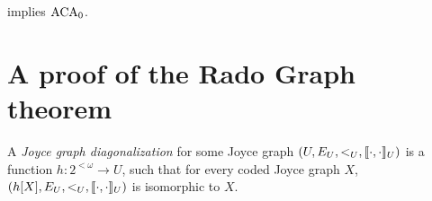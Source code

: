 \begin{corollary}
 implies $\mathrm{ACA}_0$.
\end{corollary}

\section{A proof of the Rado Graph theorem}\label{subsect:rado-from-mtt}


\begin{definition}
A \emph{Joyce graph diagonalization} for some Joyce graph $(U, E_U,  <_U, \llbracket \cdot , \cdot \rrbracket_U)$ is a function $h: 2^{<\omega} \to U$, such that for every coded Joyce graph $X$,
$(h[X], E_U, <_U, \llbracket \cdot , \cdot \rrbracket_U)$ is isomorphic to $X$.
\end{definition}

